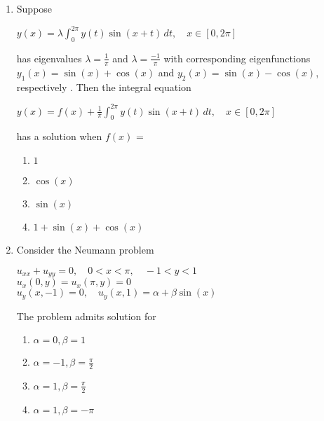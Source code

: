 \documentclass[journal]{IEEEtran}
\theoremstyle{remark}
\begin{document}
\begin{enumerate}
\begin{multicols}{4}
                \end{multicols}

                \item Suppose 
                \begin{center}
                   $ y(x) = \lambda \int_{0}^{2\pi} y(t) \sin(x+t) \, dt, \quad x \in [0, 2\pi]$
                \end{center}
                has eigenvalues $\lambda=\frac{1}{\pi}$ and $\lambda=\frac{-1}{\pi}$ with corresponding eigenfunctions $y_1(x)=\sin{(x)}+\cos{(x)}$ and $y_2(x)=\sin{(x)}-\cos{(x)}$, respectively . Then the integral equation 
                \begin{center}
                   $ y(x) = f(x) + \frac{1}{\pi} \int_{0}^{2\pi} y(t) \sin(x+t) \, dt, \quad x \in [0, 2\pi]$
                \end{center}
                has a solution when $f(x)$ =
                \begin{multicols}{2}
                \begin{enumerate}
                    \item $1$
                    \item $\cos{(x)}$
                    \item $\sin{(x)}$
                    \item $1+\sin{(x)}+\cos{(x)}$
                \end{enumerate}
                    
                \end{multicols}

                \item Consider the Neumann problem 
                \begin{center}
                    $u_{xx} + u_{yy} = 0, \quad 0 < x < \pi, \quad -1 < y < 1$\\
			$u_x(0, y) = u_x(\pi, y) = 0$\\
                    $u_y(x, -1) = 0, \quad u_y(x, 1) = \alpha + \beta \sin(x)$  

                \end{center}
                The problem admits solution for 
                \begin{multicols}{2}
                \begin{enumerate}
                    \item $\alpha=0,\beta=1$
                    \item $\alpha=-1,\beta=\frac{\pi}{2}$
                    \item $\alpha=1,\beta=\frac{\pi}{2}$
                    \item $\alpha=1,\beta=-\pi$
                \end{enumerate}
                    

\end{multicols}
\end{enumerate}
\end{document}
